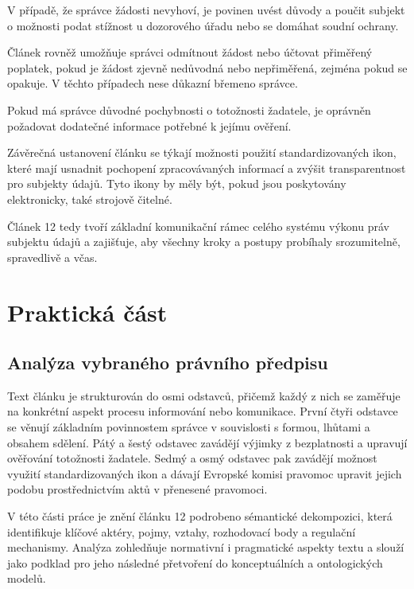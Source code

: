 V případě, že správce žádosti nevyhoví, je povinen uvést důvody a poučit subjekt o možnosti podat stížnost u dozorového úřadu nebo se domáhat soudní ochrany.

Článek rovněž umožňuje správci odmítnout žádost nebo účtovat přiměřený poplatek, pokud je žádost zjevně nedůvodná nebo nepřiměřená, zejména pokud se opakuje. V těchto případech nese důkazní břemeno správce.

Pokud má správce důvodné pochybnosti o totožnosti žadatele, je oprávněn požadovat dodatečné informace potřebné k jejímu ověření.

Závěrečná ustanovení článku se týkají možnosti použití standardizovaných ikon, které mají usnadnit pochopení zpracovávaných informací a zvýšit transparentnost pro subjekty údajů. Tyto ikony by měly být, pokud jsou poskytovány elektronicky, také strojově čitelné.

Článek 12 tedy tvoří základní komunikační rámec celého systému výkonu práv subjektu údajů a zajišťuje, aby všechny kroky a postupy probíhaly srozumitelně, spravedlivě a včas. \cite{clanek12}


\chapter{Praktická část}
\label{sec:prakticka-cast}

\section{Analýza vybraného právního předpisu}
\label{sec:analýza-vybraného-právního-předpisu}
Text článku je strukturován do osmi odstavců, přičemž každý z nich se zaměřuje na konkrétní aspekt procesu informování nebo komunikace. První čtyři odstavce se věnují základním povinnostem správce v souvislosti s formou, lhůtami a obsahem sdělení. Pátý a šestý odstavec zavádějí výjimky z bezplatnosti a upravují ověřování totožnosti žadatele. Sedmý a osmý odstavec pak zavádějí možnost využití standardizovaných ikon a dávají Evropské komisi pravomoc upravit jejich podobu prostřednictvím aktů v přenesené pravomoci.

V této části práce je znění článku 12 podrobeno sémantické dekompozici, která identifikuje klíčové aktéry, pojmy, vztahy, rozhodovací body a regulační mechanismy. Analýza zohledňuje normativní i pragmatické aspekty textu a slouží jako podklad pro jeho následné přetvoření do konceptuálních a ontologických modelů.

